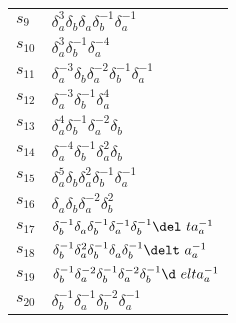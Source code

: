 \documentclass{article}
\begin{document}
\begin{center}
\begin{tabular}{ll}
$s_{9}$ & $\delta_a^{3}\delta_b^{}\delta_a^{}\delta_b^{-1}\delta_a^{-1}$ \\
$s_{10}$ & $\delta_a^{3}\delta_b^{-1}\delta_a^{-4}$ \\
$s_{11}$ & $\delta_a^{-3}\delta_b^{}\delta_a^{-2}\delta_b^{-1}\delta_a^{-1}$ \\
$s_{12}$ & $\delta_a^{-3}\delta_b^{-1}\delta_a^{4}$ \\
$s_{13}$ & $\delta_a^{4}\delta_b^{-1}\delta_a^{-2}\delta_b^{}$ \\
$s_{14}$ & $\delta_a^{-4}\delta_b^{-1}\delta_a^{2}\delta_b^{}$ \\
$s_{15}$ & $\delta_a^{5}\delta_b^{}\delta_a^{2}\delta_b^{-1}\delta_a^{-1}$ \\
$s_{16}$ & $\delta_a^{}\delta_b^{}\delta_a^{-2}\delta_b^{2}$ \\
$s_{17}$ & $\delta_b^{-1}\delta_a^{}\delta_b^{-1}\delta_a^{-1}\delta_b^{-1}\del\
ta_a^{-1}$ \\
$s_{18}$ & $\delta_b^{-1}\delta_a^{2}\delta_b^{-1}\delta_a^{}\delta_b^{-1}\delt\
a_a^{-1}$ \\
$s_{19}$ & $\delta_b^{-1}\delta_a^{-2}\delta_b^{-1}\delta_a^{-2}\delta_b^{-1}\d\
elta_a^{-1}$ \\
$s_{20}$ & $\delta_b^{-1}\delta_a^{-1}\delta_b^{-2}\delta_a^{-1}$ \\
\bottomrule
\end{tabular}
\end{center}

\thispagestyle{empty}
\end{document}
